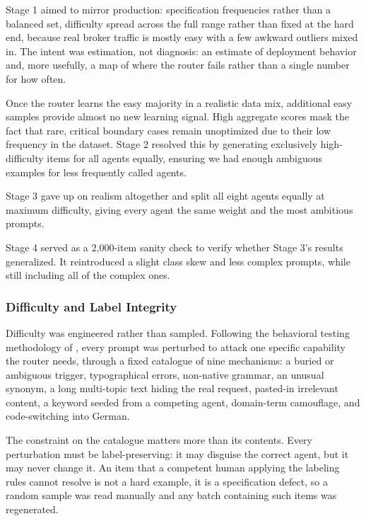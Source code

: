 Stage 1 aimed to mirror production: specification frequencies rather than a balanced set, difficulty spread across the full range rather than fixed at the hard end, because real broker traffic is mostly easy with a few awkward outliers mixed in. The intent was estimation, not diagnosis: an estimate of deployment behavior and, more usefully, a map of where the router fails rather than a single number for how often.

Once the router learns the easy majority in a realistic data mix, additional easy samples provide almost no new learning signal. High aggregate scores mask the fact that rare, critical boundary cases remain unoptimized due to their low frequency in the dataset. Stage 2 resolved this by generating exclusively high-difficulty items for all agents equally, ensuring we had enough ambiguous examples for less frequently called agents.

Stage 3 gave up on realism altogether and split all eight agents equally at maximum difficulty, giving every agent the same weight and the most ambitious prompts.

Stage 4 served as a 2,000-item sanity check to verify whether Stage 3's results generalized. It reintroduced a slight class skew and less complex prompts, while still including all of the complex ones.

\subsubsection{Difficulty and Label Integrity}\label{sec:dataset-difficulty}

Difficulty was engineered rather than sampled. Following the behavioral testing methodology of \textcite{ribeiro2020checklist}, every prompt was perturbed to attack one specific capability the router needs, through a fixed catalogue of nine mechanisms: a buried or ambiguous trigger, typographical errors, non-native grammar, an unusual synonym, a long multi-topic text hiding the real request, pasted-in irrelevant content, a keyword seeded from a competing agent, domain-term camouflage, and code-switching into German.

The constraint on the catalogue matters more than its contents. Every perturbation must be label-preserving: it may disguise the correct agent, but it may never change it. An item that a competent human applying the labeling rules cannot resolve is not a hard example, it is a specification defect, so a random sample was read manually and any batch containing such items was regenerated.

